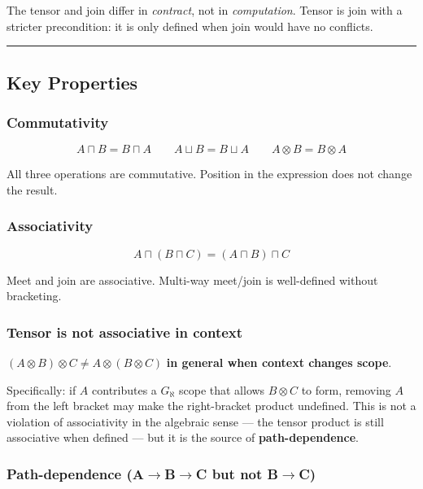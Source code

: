 \documentclass[11pt,a4paper]{article}
\begin{document}
The tensor and join differ in \emph{contract}, not in \emph{computation}. Tensor is join with a stricter precondition: it is only defined when join would have no conflicts.

\begin{center}
\rule{0.5\textwidth}{0.4pt}
\end{center}

\subsection{Key Properties}

\subsubsection{Commutativity}

\[A \sqcap B = B \sqcap A \qquad A \sqcup B = B \sqcup A \qquad A \otimes B = B \otimes A\]

All three operations are commutative. Position in the expression does not change the result.

\subsubsection{Associativity}

\[A \sqcap (B \sqcap C) = (A \sqcap B) \sqcap C\]

Meet and join are associative. Multi-way meet/join is well-defined without bracketing.

\subsubsection{Tensor is \textbf{not} associative in context}

$(A \otimes B) \otimes C \neq A \otimes (B \otimes C)$ \textbf{in general when context changes scope}.

Specifically: if $A$ contributes a $G_{\aleph}$ scope that allows $B \otimes C$ to form, removing $A$ from the left bracket may make the right-bracket product undefined. This is not a violation of associativity in the algebraic sense --- the tensor product is still associative when defined --- but it is the source of \textbf{path-dependence}.

\subsubsection{Path-dependence (A$\rightarrow$B$\rightarrow$C but not B$\rightarrow$C)}
\end{document}
